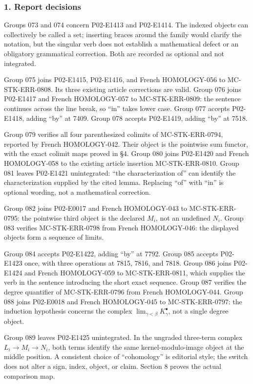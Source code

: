 \documentclass[11pt]{article}
\begin{document}
\subsubsection{1. Report decisions}\label{report-decisions}

Groups 073 and 074 concern P02-E1413 and P02-E1414. The indexed objects can collectively be called a set; inserting braces around the family would clarify the notation, but the singular verb does not establish a mathematical defect or an obligatory grammatical correction. Both are recorded as optional and not integrated.

Group 075 joins P02-E1415, P02-E1416, and French HOMOLOGY-056 to MC-STK-ERR-0808. Its three existing article corrections are valid. Group 076 joins P02-E1417 and French HOMOLOGY-057 to MC-STK-ERR-0809: the sentence continues across the line break, so ``in'' takes lower case. Group 077 accepts P02-E1418, adding ``by'' at 7409. Group 078 accepts P02-E1419, adding ``by'' at 7518.

Group 079 verifies all four parenthesized colimits of MC-STK-ERR-0794, reported by French HOMOLOGY-042. Their object is the pointwise sum functor, with the exact colimit maps proved in §4. Group 080 joins P02-E1420 and French HOMOLOGY-058 to the existing article insertion MC-STK-ERR-0810. Group 081 leaves P02-E1421 unintegrated: ``the characterization of'' can identify the characterization supplied by the cited lemma. Replacing ``of'' with ``in'' is optional wording, not a mathematical correction.

Group 082 joins P02-E0017 and French HOMOLOGY-043 to MC-STK-ERR-0795: the pointwise third object is the declared \(M_i\), not an undefined \(N_i\). Group 083 verifies MC-STK-ERR-0798 from French HOMOLOGY-046: the displayed objects form a sequence of limits.

Group 084 accepts P02-E1422, adding ``by'' at 7792. Group 085 accepts P02-E1423 once, with three operations at 7815, 7816, and 7818. Group 086 joins P02-E1424 and French HOMOLOGY-059 to MC-STK-ERR-0811, which supplies the verb in the sentence introducing the short exact sequence. Group 087 verifies the degree quantifier of MC-STK-ERR-0796 from French HOMOLOGY-044. Group 088 joins P02-E0018 and French HOMOLOGY-045 to MC-STK-ERR-0797: the induction hypothesis concerns the complex \(\lim_{\gamma<\beta}K_\gamma^\bullet\), not a single degree object.

Group 089 leaves P02-E1425 unintegrated. In the ungraded three-term complex \(L_i\to M_i\to N_i\), both terms identify the same kernel-modulo-image object at the middle position. A consistent choice of ``cohomology'' is editorial style; the switch does not alter a sign, index, object, or claim. Section 8 proves the actual comparison map.
\end{document}
